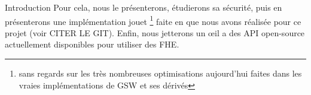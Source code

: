 \begin{section}{Introduction}
	Pour cela, nous le présenterons, étudierons sa sécurité, puis en présenterons une implémentation jouet \footnote{sans regards sur les très nombreuses optimisations aujourd'hui faites dans les vraies implémentations de GSW et ses dérivés} faite en  que nous avons réalisée pour ce projet (voir CITER LE GIT). Enfin, nous jetterons un \oe{}il a des API open-source  actuellement disponibles pour utiliser des FHE.
\end{section}
